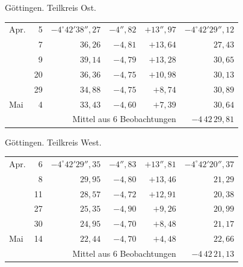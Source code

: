 \noindent\begin{minipage}[t]{.495\textwidth}\centering Göttingen. Teilkreis Ost.\par\smallskip
{\scriptsize\setlength{\tabcolsep}{1pt}\renewcommand{\arraystretch}{1.2}\begin{tabular}{lr|r|r|r|r|}
Apr.&5&$-4^\circ42'38''{,}27$&$-4''{,}82$&$+13''{,}97$&$-4^\circ42'29''{,}12$\\
&7&$36{,}26$&$-4{,}81$&$+13{,}64$&$27{,}43$\\
&9&$39{,}14$&$-4{,}79$&$+13{,}28$&$30{,}65$\\
&20&$36{,}36$&$-4{,}75$&$+10{,}98$&$30{,}13$\\
&29&$34{,}88$&$-4{,}75$&$+8{,}74$&$30{,}89$\\
Mai&4&$33{,}43$&$-4{,}60$&$+7{,}39$&$30{,}64$\\
\cline{6-6}\multicolumn{5}{r}{Mittel aus 6 Beobachtungen}&$-4\,42\,29{,}81$
\end{tabular}}\end{minipage}\hfill\begin{minipage}[t]{.495\textwidth}\centering Göttingen. Teilkreis West.\par\smallskip
{\scriptsize\setlength{\tabcolsep}{1pt}\renewcommand{\arraystretch}{1.2}\begin{tabular}{lr|r|r|r|r}
Apr.&6&$-4^\circ42'29''{,}35$&$-4''{,}83$&$+13''{,}81$&$-4^\circ42'20''{,}37$\\
&8&$29{,}95$&$-4{,}80$&$+13{,}46$&$21{,}29$\\
&11&$28{,}57$&$-4{,}72$&$+12{,}91$&$20{,}38$\\
&27&$25{,}35$&$-4{,}90$&$+9{,}26$&$20{,}99$\\
&30&$24{,}95$&$-4{,}70$&$+8{,}48$&$21{,}17$\\
Mai&14&$22{,}44$&$-4{,}70$&$+4{,}48$&$22{,}66$\\
\cline{6-6}\multicolumn{5}{r}{Mittel aus 6 Beobachtungen}&$-4\,42\,21{,}13$
\end{tabular}}\end{minipage}
\par\vspace{4mm}

